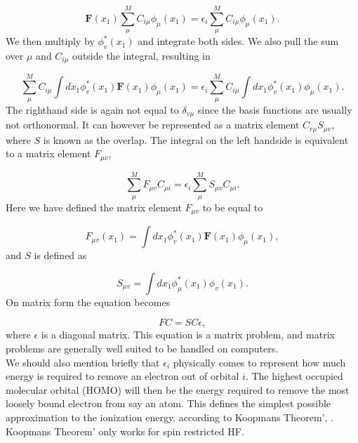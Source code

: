 \documentclass[a4paper,norsk,11pt,twoside]{report}
\begin{document}
\begin{equation}
\textbf{F}(x_1) \sum_{\mu}^M C_{i \mu} \phi_{\mu}(x_1) = \epsilon_{i} \sum_{\mu}^M C_{i \mu} \phi_{\mu}(x_1) .
\end{equation}
We then multiply by $\phi_v^*(x_1)$ and integrate both sides. We also pull the sum over $\mu$ and $C_{i \mu}$ 
outside the integral, resulting in

\begin{equation}
\sum_{\mu}^M C_{i \mu} \int dx_1 \phi^*_{v}(x_1) \textbf{F}(x_1) \phi_{\mu}(x_1)
= \epsilon_{i} \sum_{\mu}^M C_{i \mu} \int dx_1 \phi^*_{v}(x_1) \phi_{\mu}(x_1) .
\label{fock_to_solve}
\end{equation}
The righthand side is again not equal to $\delta_{v \mu}$ since the basis functions are usually not orthonormal. It can however be represented as a matrix element $C_{r \mu} S_{\mu v}$, where $S$ is known as the overlap. 
The integral on the left handside is equivalent to a matrix element $F_{\mu v}$, 

\begin{equation}
\sum_{\mu}^M F_{\mu v} C_{\mu i} 
= \epsilon_{i} \sum_{\mu}^M S_{\mu v} C_{\mu i}  .
\end{equation}
Here we have defined the matrix element $F_{\mu v}$ to be equal to

\begin{equation}
F_{\mu v}(x_1) = \int dx_1 \phi^*_{v}(x_1) \textbf{F}(x_1) \phi_{\mu}(x_1) ,
\label{hfreferancekk}
\end{equation}
and $S$ is defined as

\begin{equation}
S_{\mu v} = \int dx_1 \phi_{\mu}^*(x_1) \phi_v(x_1) .
\end{equation}
On matrix form the equation becomes

\begin{equation}
FC = SC \epsilon , \label{FOCK_EQUATION_STUFF}
\end{equation}
where $\epsilon$ is a diagonal matrix. This equation is a matrix
problem, and matrix problems are generally well suited to be handled on computers. \\

We should also mention briefly that $\epsilon_{i}$ physically comes to
represent how much energy is required to remove an electron out of
orbital $i$. The highest occupied molecular orbital (HOMO) will then
be the energy required to remove the most loosely bound electron from say an atom. This defines the simplest possible approximation to the  ionization
energy, according to Koopmans Theorem',
\cite{KoopmansTheorem}. Koopmans Theorem' only works for spin
restricted HF. \\
\end{document}
